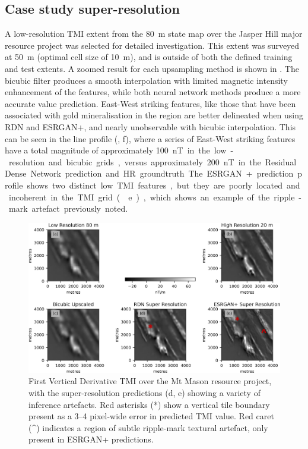 \subsection{Case study super-resolution}
A low-resolution TMI extent from the \qty{80}{\metre} state map over the Jasper Hill major resource project was selected for detailed investigation.
This extent was surveyed at \qty{50}{\metre} (optimal cell size of \qty{10}{\metre}), and is outside of both the defined training and test extents.
A zoomed result for each upsampling method is shown in .
The bicubic filter produces a smooth interpolation with limited magnetic intensity enhancement of the features, while both neural network methods produce a more accurate value prediction.
East-West striking features, like those that have been associated with gold mineralisation in the region \parencite[p.~283]{salierTimingSourceGoldbearing2003} are better delineated when using RDN\textdaggerdbl{} and ESRGAN+, and nearly unobservable with bicubic interpolation.
This can be seen in the line profile (, f), where a series of East-West striking features have a total magnitude of approximately \qty{100}nT in the low-resolution and bicubic grids, versus approximately \qty{200}nT in the Residual Dense Network prediction and HR groundtruth.
The ESRGAN+ prediction profile shows two distinct low TMI features, but they are poorly located and incoherent in the TMI grid ( e), which shows an example of the ripple-mark artefact previously noted.


\begin{landscape}
    \begin{figure}[hbtp]
        \centering
        \includegraphics[width=\linewidth,trim={0 0 0 0},clip]{fig/p1/1vd.jpg}
        \caption[First vertical derivative over the case study grid]{First Vertical Derivative TMI over the Mt Mason resource project, with the super-resolution predictions (d, e) showing a variety of inference artefacts.
        Red asterisks (*) show a vertical tile boundary present as a 3--4 pixel-wide error in predicted TMI value.
        Red caret (\^{ }) indicates a region of subtle ripple-mark textural artefact, only present in ESRGAN+ predictions.
        }
        \label{fig:jhillvis}
    \end{figure}
\end{landscape}

